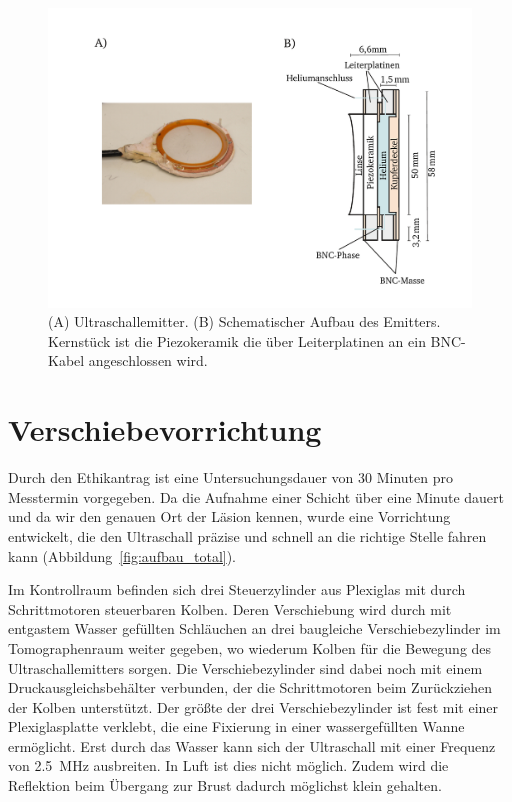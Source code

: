 \documentclass[
    11pt,
    ngerman
]{scrbook}
\begin{document}
\begin{figure}
    \centering
    \includegraphics[width=.8\textwidth]{Abbildungen/emitter.pdf}
    \caption{(A) Ultraschallemitter. (B) Schematischer Aufbau des Emitters. Kernstück ist die Piezokeramik die über Leiterplatinen an ein BNC-Kabel angeschlossen wird.}
    \label{fig:emitter}
\end{figure}

\section{Verschiebevorrichtung}

Durch den Ethikantrag ist eine Untersuchungsdauer von 30 Minuten pro Messtermin
vorgegeben. Da die Aufnahme einer Schicht über eine Minute dauert und da wir
den genauen Ort der Läsion kennen, wurde eine Vorrichtung entwickelt, die den
Ultraschall präzise und schnell an die richtige Stelle fahren kann
(Abbildung~\ref{fig:aufbau_total}).

Im Kontrollraum befinden sich drei Steuerzylinder aus Plexiglas mit durch
Schrittmotoren steuerbaren Kolben. Deren Verschiebung wird durch mit
entgastem Wasser gefüllten Schläuchen an drei baugleiche Verschiebezylinder im
Tomographenraum weiter gegeben, wo wiederum Kolben für die Bewegung des
Ultraschallemitters sorgen. Die Verschiebezylinder sind dabei noch mit einem
Druckausgleichsbehälter verbunden, der die Schrittmotoren beim Zurückziehen der
Kolben unterstützt. Der größte der drei Verschiebezylinder ist fest mit einer
Plexiglasplatte verklebt, die eine Fixierung in einer wassergefüllten Wanne
ermöglicht. Erst durch das Wasser kann sich der Ultraschall mit einer Frequenz
von \SI{2.5}{\mega\hertz} ausbreiten. In Luft ist dies nicht möglich. Zudem wird
die Reflektion beim Übergang zur Brust dadurch möglichst klein gehalten.
\end{document}
